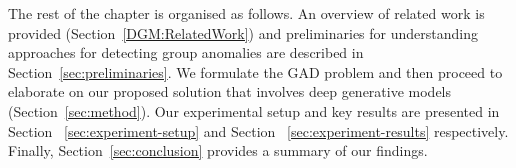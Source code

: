 The rest of the chapter is organised as follows. An overview of related work is provided (Section~\ref{DGM:RelatedWork}) and preliminaries for understanding approaches for detecting  group anomalies are described in Section~\ref{sec:preliminaries}.
We formulate the GAD problem and then proceed to elaborate on our proposed solution that involves deep generative models (Section~\ref{sec:method}).
Our experimental setup and key results are presented in Section~ \ref{sec:experiment-setup}  and Section ~\ref{sec:experiment-results} respectively.
Finally, Section~\ref{sec:conclusion} provides a summary of our findings. %
